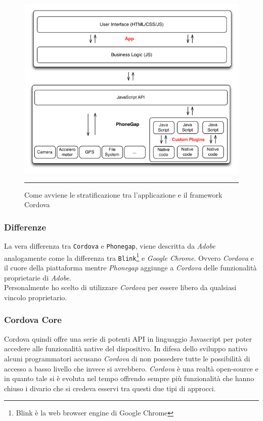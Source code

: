 \begin{figure}[!h]
  \centering
    \includegraphics[scale=0.65]{Figures/cordova_schema.png} 
    \rule{35em}{0.5pt}
  \caption[Struttura a Livelli di Cordova]{Come avviene le stratificazione tra l'applicazione e il framework Cordova}
  \label{fig:cordova-layers}
\end{figure}

\subsubsection{Differenze}
La vera differenza tra \texttt{Cordova} e \texttt{Phonegap}, viene descritta da \emph{Adobe} analogamente come la differenza tra \texttt{Blink}\footnote{Blink è la web browser engine di Google Chrome\cite{wiki:blink}} e \emph{Google Chrome}. Ovvero \emph{Cordova} e il cuore della piattaforma mentre \emph{Phonegap} aggiunge a \emph{Cordova} delle funzionalità proprietarie di \emph{Adobe}.\\
Personalmente ho scelto di utilizzare \emph{Cordova} per essere libero da qualsiasi vincolo proprietario.

\subsubsection{Cordova Core}
Cordova quindi offre una serie di potenti API in linguaggio Javascript per poter accedere alle funzionalità native del dispositivo. In difesa dello sviluppo nativo alcuni programmatori accusano \emph{Cordova} di non possedere tutte le possibilità di accesso a basso livello che invece si avrebbero. \emph{Cordova} è una realtà open-source e in quanto tale si è evoluta nel tempo offrendo sempre più funzionalità che hanno chiuso i divario che si credeva esservi tra questi due tipi di approcci.

